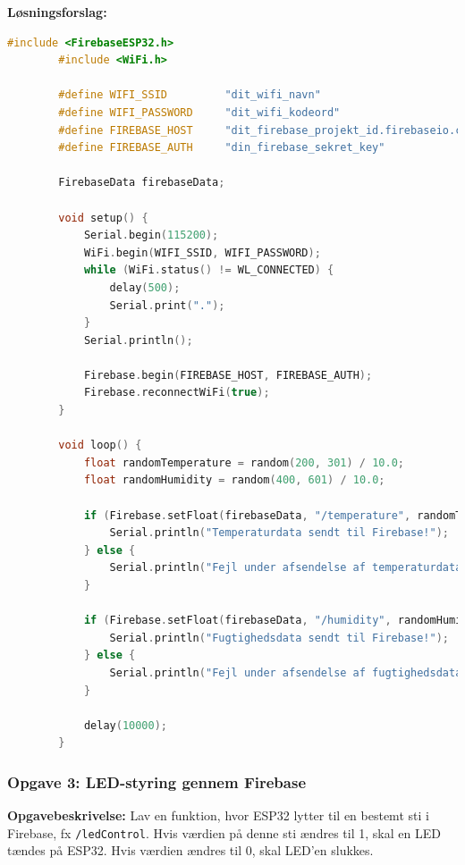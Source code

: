 \documentclass[12pt,a4paper]{book}
\begin{document}
	\textbf{Løsningsforslag:}
	\begin{lstlisting}[language=C++]
		#include <FirebaseESP32.h>
		#include <WiFi.h>
		
		#define WIFI_SSID         "dit_wifi_navn"
		#define WIFI_PASSWORD     "dit_wifi_kodeord"
		#define FIREBASE_HOST     "dit_firebase_projekt_id.firebaseio.com"
		#define FIREBASE_AUTH     "din_firebase_sekret_key"
		
		FirebaseData firebaseData;
		
		void setup() {
			Serial.begin(115200);
			WiFi.begin(WIFI_SSID, WIFI_PASSWORD);
			while (WiFi.status() != WL_CONNECTED) {
				delay(500);
				Serial.print(".");
			}
			Serial.println();
			
			Firebase.begin(FIREBASE_HOST, FIREBASE_AUTH);
			Firebase.reconnectWiFi(true);
		}
		
		void loop() {
			float randomTemperature = random(200, 301) / 10.0;
			float randomHumidity = random(400, 601) / 10.0;
			
			if (Firebase.setFloat(firebaseData, "/temperature", randomTemperature)) {
				Serial.println("Temperaturdata sendt til Firebase!");
			} else {
				Serial.println("Fejl under afsendelse af temperaturdata: " + firebaseData.errorReason());
			}
			
			if (Firebase.setFloat(firebaseData, "/humidity", randomHumidity)) {
				Serial.println("Fugtighedsdata sendt til Firebase!");
			} else {
				Serial.println("Fejl under afsendelse af fugtighedsdata: " + firebaseData.errorReason());
			}
			
			delay(10000);
		}
	\end{lstlisting}
	\clearpage
	\subsubsection*{Opgave 3: LED-styring gennem Firebase}
	
	\textbf{Opgavebeskrivelse:} Lav en funktion, hvor ESP32 lytter til en bestemt sti i Firebase, fx \texttt{/ledControl}. Hvis værdien på denne sti ændres til 1, skal en LED tændes på ESP32. Hvis værdien ændres til 0, skal LED'en slukkes.
	
\end{document}
